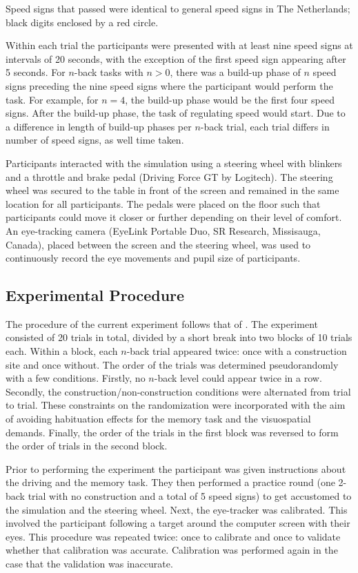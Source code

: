 Speed signs that passed were identical to general speed signs in The Netherlands; black digits enclosed by a red circle. 

Within each trial the participants were presented with at least nine speed signs at intervals of 20 seconds, with the exception of the first speed sign appearing after 5 seconds. 
For \(n\)-back tasks with \(n > 0\), there was a build-up phase of \(n\) speed signs preceding the nine speed signs where the participant would perform the task. 
For example, for \(n = 4\), the build-up phase would be the first four speed signs. 
After the build-up phase, the task of regulating speed would start. 
Due to a difference in length of build-up phases per \(n\)-back trial, each trial differs in number of speed signs, as well time taken.

Participants interacted with the simulation using a steering wheel with blinkers and a throttle and brake pedal (Driving Force GT by Logitech). 
The steering wheel was secured to the table in front of the screen and remained in the same location for all participants. 
The pedals were placed on the floor such that participants could move it closer or further depending on their level of comfort. 
An eye-tracking camera (EyeLink Portable Duo, SR Research, Missisauga, Canada), placed between the screen and the steering wheel, was used to continuously record the eye movements and pupil size of participants. 

\subsection{Experimental Procedure}
The procedure of the current experiment follows that of \citet{Scheunemann2019}.
The experiment consisted of 20 trials in total, divided by a short break into two blocks of 10 trials each. 
Within a block, each \(n\)-back trial appeared twice: once with a construction site and once without. 
The order of the trials was determined pseudorandomly with a few conditions. 
Firstly, no \(n\)-back level could appear twice in a row. 
Secondly, the construction/non-construction conditions were alternated from trial to trial. 
These constraints on the randomization were incorporated with the aim of avoiding habituation effects for the memory task and the visuospatial demands. 
Finally, the order of the trials in the first block was reversed to form the order of trials in the second block.

Prior to performing the experiment the participant was given instructions about the driving and the memory task. 
They then performed a practice round (one 2-back trial with no construction and a total of 5 speed signs) to get accustomed to the simulation and the steering wheel. 
Next, the eye-tracker was calibrated. 
This involved the participant following a target around the computer screen with their eyes. 
This procedure was repeated twice: once to calibrate and once to validate whether that calibration was accurate. 
Calibration was performed again in the case that the validation was inaccurate.

